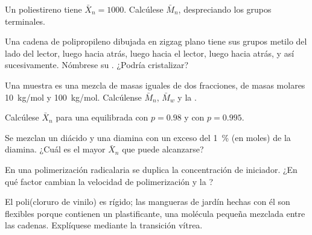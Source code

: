\begin{exercise}[$\star$]\label{exo:b2:polymer-synthesis:3}
Un poliestireno tiene $\bar X_n = 1000$. Calcúlese $\bar M_n$, despreciando los grupos terminales.
\end{exercise}

\begin{exercise}[$\star$]\label{exo:b2:polymer-synthesis:4}
Una cadena de polipropileno dibujada en zigzag plano tiene sus grupos metilo del lado del lector, luego
hacia atrás, luego hacia el lector, luego hacia atrás, y así sucesivamente. Nómbrese su . ¿Podría cristalizar?
\end{exercise}

\begin{exercise}[$\star\star$]\label{exo:b2:polymer-synthesis:5}
Una muestra es una mezcla de masas iguales de dos fracciones, de masas molares \qty{10}{kg/mol} y
\qty{100}{kg/mol}. Calcúlense $\bar M_n$, $\bar M_w$ y la .
\end{exercise}

\begin{exercise}[$\star\star$]\label{exo:b2:polymer-synthesis:6}
Calcúlese $\bar X_n$ para una  equilibrada con $p = 0.98$ y con $p = 0.995$.
\end{exercise}

\begin{exercise}[$\star\star$]\label{exo:b2:polymer-synthesis:7}
Se mezclan un diácido y una diamina con un exceso del 1~\% (en moles) de la diamina. ¿Cuál es el mayor
$\bar X_n$ que puede alcanzarse?
\end{exercise}

\begin{exercise}[$\star\star$]\label{exo:b2:polymer-synthesis:8}
En una polimerización radicalaria se duplica la concentración de iniciador. ¿En qué factor cambian la velocidad de
polimerización y la ?
\end{exercise}

\begin{exercise}[$\star\star$]\label{exo:b2:polymer-synthesis:9}
El poli(cloruro de vinilo) es rígido; las mangueras de jardín hechas con él son flexibles porque contienen un plastificante,
una molécula pequeña mezclada entre las cadenas. Explíquese mediante la transición vítrea.
\end{exercise}

